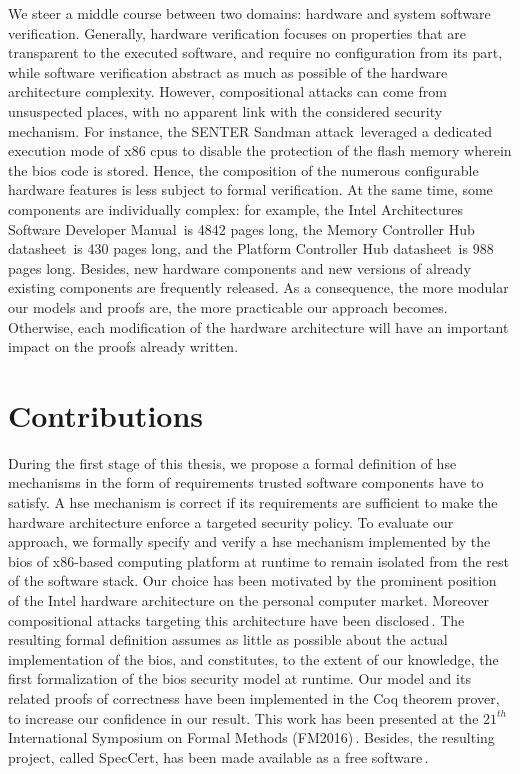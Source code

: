 We steer a middle course between two domains: hardware and system software
verification.
%
Generally, hardware verification focuses on properties that are transparent to
the executed software, and require no configuration from its part, while
software verification abstract as much as possible of the hardware architecture
complexity.
%
However, compositional attacks can come from unsuspected places, with no apparent link
with the considered security mechanism.
%
For instance, the SENTER Sandman attack\,\cite{kovah2015senter} leveraged a
dedicated execution mode of x86 \acp{cpu} to disable the protection of the flash
memory wherein the \ac{bios} code is stored.
%
Hence, the composition of the numerous configurable hardware features is less
subject to formal verification.
%
At the same time, some components are individually complex: for example, the
Intel Architectures Software Developer Manual\,\cite{intel2014manual} is 4842
pages long, the Memory Controller Hub datasheet\,\cite{intel2009mch} is 430
pages long, and the Platform Controller Hub datasheet\,\cite{intel2012pch} is
988 pages long.
%
Besides, new hardware components and new versions of already existing components
are frequently released.
%
As a consequence, the more modular our models and proofs are, the more
practicable our approach becomes.
%
Otherwise, each modification of the hardware architecture will have an important
impact on the proofs already written.

\section{Contributions}

During the first stage of this thesis, we propose a formal definition of
\ac{hse} mechanisms in the form of requirements trusted software components have
to satisfy.
%
A \ac{hse} mechanism is correct if its requirements are sufficient to make the
hardware architecture enforce a targeted security policy.
%
To evaluate our approach, we formally specify and verify a \ac{hse} mechanism
implemented by the \ac{bios} of x86-based computing platform at runtime to
remain isolated from the rest of the software stack.
%
Our choice has been motivated by the prominent position of the Intel hardware
architecture on the personal computer market.
%
Moreover compositional attacks targeting this architecture have been
disclosed\,\cite{duflot2009smram,wojtczuk2009smram,domas2015sinkhole,kallenberg2015racecondition,kovah2015senter}.
%
The resulting formal definition assumes as little as possible about the actual
implementation of the \ac{bios}, and constitutes, to the extent of our
knowledge, the first formalization of the \ac{bios} security model at runtime.
%
Our model and its related proofs of correctness have been implemented in the Coq
theorem prover, to increase our confidence in our result.
%
This work has been presented at the $21^{th}$ International Symposium on Formal
Methods (FM2016)\,\cite{letan2016speccert}.
%
Besides, the resulting project, called SpecCert, has been made available as a
free software\,\cite{letan2016speccertcode}.

